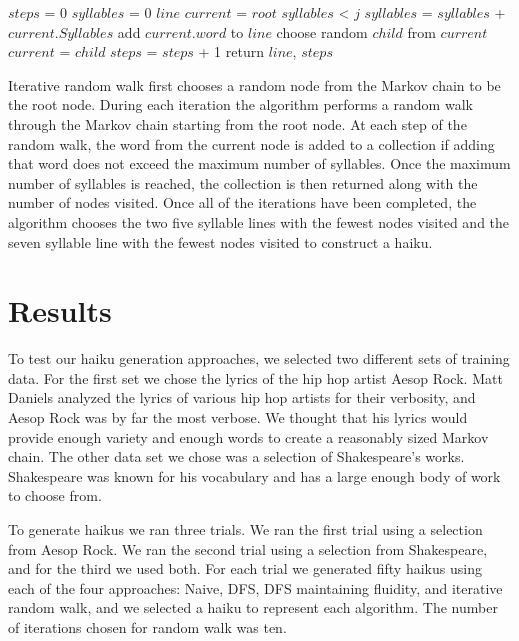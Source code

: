 \documentclass[]{article}
\begin{document}
\begin{algorithm}[H]
	\caption{$RandomWalk(root, j)$} \label{RandomWalk}
	\begin{algorithmic}[1]
		\State $steps$ = 0
		\State $syllables$ = 0
		\State $line$
		\State $current$ = $root$
		\While $syllables$ < $j$
				$syllables$ = $syllables$ + $current.Syllables$
				\State add $current.word$ to $line$
			\EndIf
			\State choose random $child$ from $current$
			$current$ = $child$
			$steps$ = $steps$ + 1
		\EndWhile
		\State return $line$, $steps$
	\end{algorithmic}
\end{algorithm}

Iterative random walk first chooses a random node from the Markov chain to be the root node. During each iteration the algorithm performs a random walk through the Markov chain starting from the root node. At each step of the random walk, the word from the current node is added to a collection if adding that word does not exceed the maximum number of syllables. Once the maximum number of syllables is reached, the collection is then returned along with the number of nodes visited. Once all of the iterations have been completed, the algorithm chooses the two five syllable lines with the fewest nodes visited and the seven syllable line with the fewest nodes visited to construct a haiku. 

\section{Results}
To test our haiku generation approaches, we selected two different sets of training data. For the first set we chose the lyrics of the hip hop artist Aesop Rock. Matt Daniels analyzed the lyrics of various hip hop artists for their verbosity, and Aesop Rock was by far the most verbose\cite{Vocab}. We thought that his lyrics would provide enough variety and enough words to create a reasonably sized Markov chain. The other data set we chose was a selection of Shakespeare's works. Shakespeare was known for his vocabulary and has a large enough body of work to choose from.

To generate haikus we ran three trials. We ran the first trial using a selection from Aesop Rock. We ran the second trial using a selection from Shakespeare, and for the third we used both. For each trial we generated fifty haikus using each of the four approaches: Naive, DFS, DFS maintaining fluidity, and iterative random walk, and we selected a haiku to represent each algorithm. The number of iterations chosen for random walk was ten.
\end{document}
